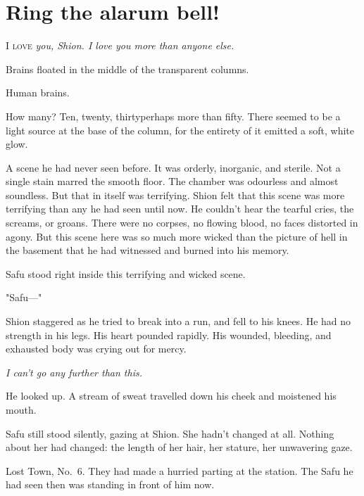 
\chapter{Ring the alarum bell!}


\lettrine{I}{ love} \emph{you, Shion. I love you more than anyone else.}

\mybreak

Brains floated in the middle of the transparent columns.

Human brains.

How many? Ten, twenty, thirty\el perhaps more than fifty. There seemed
to be a light source at the base of the column, for the entirety of it
emitted a soft, white glow.

A scene he had never seen before. It was orderly, inorganic, and
sterile. Not a single stain marred the smooth floor. The chamber was
odourless and almost soundless. But that in itself was terrifying. Shion
felt that this scene was more terrifying than any he had seen until now.
He couldn't hear the tearful cries, the screams, or groans. There were
no corpses, no flowing blood, no faces distorted in agony. But this
scene here was so much more wicked than the picture of hell in the
basement that he had witnessed and burned into his memory.

Safu stood right inside this terrifying and wicked scene.

"Safu---"

Shion staggered as he tried to break into a run, and fell to his knees.
He had no strength in his legs. His heart pounded rapidly. His wounded,
bleeding, and exhausted body was crying out for mercy.

\emph{I can't go any further than this.}

He looked up. A stream of sweat travelled down his cheek and moistened
his mouth.

Safu still stood silently, gazing at Shion. She hadn't changed at all.
Nothing about her had changed: the length of her hair, her stature, her
unwavering gaze.

Lost Town, No.~6. They had made a hurried parting at the station. The
Safu he had seen then was standing in front of him now.

